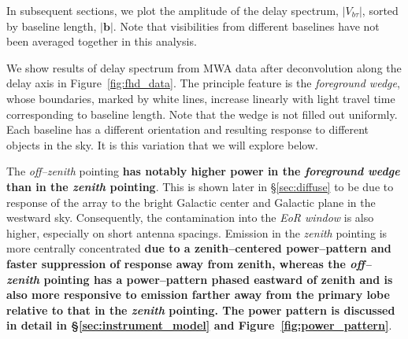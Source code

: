 \documentclass[preprint2,iop,numberedappendix]{emulateapj}
\begin{document}
In subsequent sections, we plot the amplitude of the delay spectrum, $|V_{b\tau}|$, sorted by baseline length, $|\boldsymbol{b}|$. Note that visibilities from different baselines have not been averaged together in this analysis. 

We show results of delay spectrum from MWA data after deconvolution along the delay axis in Figure~\ref{fig:fhd_data}. The principle feature is the {\it foreground wedge}, whose boundaries, marked by white lines, increase linearly with light travel time corresponding to baseline length. Note that the wedge is not filled out uniformly. Each baseline has a different orientation and resulting response to different objects in the sky. It is this variation that we will explore below. 

The {\it off--zenith} pointing {\bf has notably higher power in the {\it foreground wedge} than in the {\it zenith} pointing}. This is shown later in \S\ref{sec:diffuse} to be due to response of the array to the bright Galactic center and Galactic plane in the westward sky. Consequently, the contamination into the {\it EoR window} is also higher, especially on short antenna spacings. Emission in the {\it zenith} pointing is more centrally concentrated {\bf due to a zenith--centered power--pattern and faster suppression of response away from zenith, whereas the {\it off--zenith} pointing has a power--pattern phased eastward of zenith and is also more responsive to emission farther away from the primary lobe relative to that in the {\it zenith} pointing. The power pattern is discussed in detail in \S\ref{sec:instrument_model} and Figure~\ref{fig:power_pattern}}.
\end{document}
